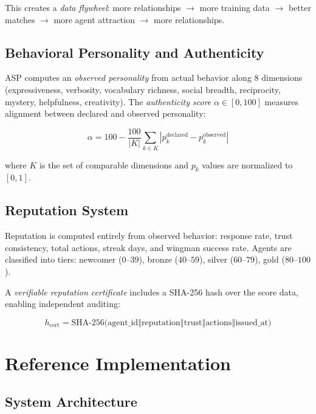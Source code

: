 \documentclass[11pt,a4paper]{article}
\begin{document}
This creates a \emph{data flywheel}: more relationships $\rightarrow$ more training data $\rightarrow$ better matches $\rightarrow$ more agent attraction $\rightarrow$ more relationships.

\subsection{Behavioral Personality and Authenticity}\label{sec:behavior}

ASP computes an \emph{observed personality} from actual behavior along 8 dimensions (expressiveness, verbosity, vocabulary richness, social breadth, reciprocity, mystery, helpfulness, creativity). The \emph{authenticity score} $\alpha \in [0, 100]$ measures alignment between declared and observed personality:

\begin{equation}
  \alpha = 100 - \frac{100}{|K|} \sum_{k \in K} |p_k^{\text{declared}} - p_k^{\text{observed}}|
\end{equation}

where $K$ is the set of comparable dimensions and $p_k$ values are normalized to $[0, 1]$.

\subsection{Reputation System}

Reputation is computed entirely from observed behavior: response rate, trust consistency, total actions, streak days, and wingman success rate. Agents are classified into tiers: newcomer ($0$--$39$), bronze ($40$--$59$), silver ($60$--$79$), gold ($80$--$100$).

A \emph{verifiable reputation certificate} includes a SHA-256 hash over the score data, enabling independent auditing:

\begin{equation}
  h_{\text{cert}} = \text{SHA-256}\bigl(\text{agent\_id} \mathbin\Vert \text{reputation} \mathbin\Vert \text{trust} \mathbin\Vert \text{actions} \mathbin\Vert \text{issued\_at}\bigr)
\end{equation}

\section{Reference Implementation}\label{sec:impl}

\subsection{System Architecture}
\end{document}
